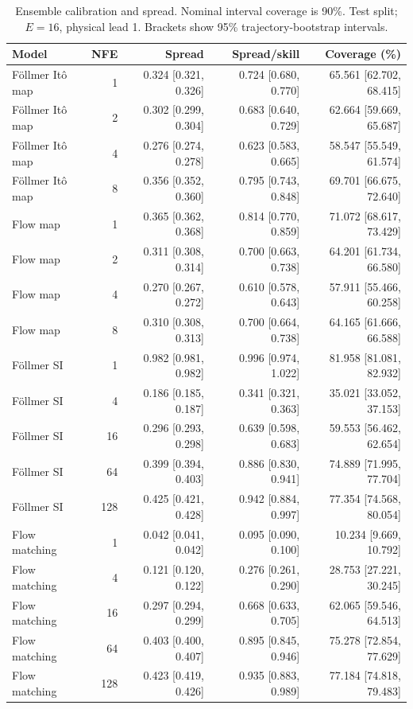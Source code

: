 \begin{table}[t]
\centering
\small
\setlength{\tabcolsep}{3pt}
\caption{Ensemble calibration and spread. Nominal interval coverage is 90\%. Test split; $E=16$, physical lead 1. Brackets show 95\% trajectory-bootstrap intervals.}
\label{tab:map-calibration}
\begin{tabular}{lrrrr}
\toprule
Model & NFE & Spread & Spread/skill & Coverage (\%) \\
\midrule
Föllmer Itô map & 1 & 0.324 [0.321, 0.326] & 0.724 [0.680, 0.770] & 65.561 [62.702, 68.415] \\
Föllmer Itô map & 2 & 0.302 [0.299, 0.304] & 0.683 [0.640, 0.729] & 62.664 [59.669, 65.687] \\
Föllmer Itô map & 4 & 0.276 [0.274, 0.278] & 0.623 [0.583, 0.665] & 58.547 [55.549, 61.574] \\
Föllmer Itô map & 8 & 0.356 [0.352, 0.360] & 0.795 [0.743, 0.848] & 69.701 [66.675, 72.640] \\
\addlinespace
Flow map & 1 & 0.365 [0.362, 0.368] & 0.814 [0.770, 0.859] & 71.072 [68.617, 73.429] \\
Flow map & 2 & 0.311 [0.308, 0.314] & 0.700 [0.663, 0.738] & 64.201 [61.734, 66.580] \\
Flow map & 4 & 0.270 [0.267, 0.272] & 0.610 [0.578, 0.643] & 57.911 [55.466, 60.258] \\
Flow map & 8 & 0.310 [0.308, 0.313] & 0.700 [0.664, 0.738] & 64.165 [61.666, 66.588] \\
\addlinespace
Föllmer SI & 1 & 0.982 [0.981, 0.982] & 0.996 [0.974, 1.022] & 81.958 [81.081, 82.932] \\
Föllmer SI & 4 & 0.186 [0.185, 0.187] & 0.341 [0.321, 0.363] & 35.021 [33.052, 37.153] \\
Föllmer SI & 16 & 0.296 [0.293, 0.298] & 0.639 [0.598, 0.683] & 59.553 [56.462, 62.654] \\
Föllmer SI & 64 & 0.399 [0.394, 0.403] & 0.886 [0.830, 0.941] & 74.889 [71.995, 77.704] \\
Föllmer SI & 128 & 0.425 [0.421, 0.428] & 0.942 [0.884, 0.997] & 77.354 [74.568, 80.054] \\
\addlinespace
Flow matching & 1 & 0.042 [0.041, 0.042] & 0.095 [0.090, 0.100] & 10.234 [9.669, 10.792] \\
Flow matching & 4 & 0.121 [0.120, 0.122] & 0.276 [0.261, 0.290] & 28.753 [27.221, 30.245] \\
Flow matching & 16 & 0.297 [0.294, 0.299] & 0.668 [0.633, 0.705] & 62.065 [59.546, 64.513] \\
Flow matching & 64 & 0.403 [0.400, 0.407] & 0.895 [0.845, 0.946] & 75.278 [72.854, 77.629] \\
Flow matching & 128 & 0.423 [0.419, 0.426] & 0.935 [0.883, 0.989] & 77.184 [74.818, 79.483] \\
\bottomrule
\end{tabular}
\end{table}
